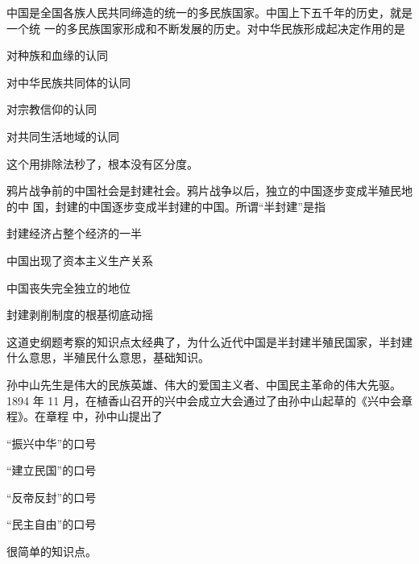 \documentclass[lang=cn,newtx,10pt,scheme=chinese,pad,twocol]{zznote}
\begin{document}
\begin{exercise}中国是全国各族人民共同缔造的统一的多民族国家。中国上下五千年的历史，就是一个统 一的多民族国家形成和不断发展的历史。对中华民族形成起决定作用的是
	\begin{choice}
		\item 对种族和血缘的认同
		\item 对中华民族共同体的认同
		\item 对宗教信仰的认同
		\item 对共同生活地域的认同
	\end{choice}
\end{exercise}
\begin{solution}
	这个用排除法秒了，根本没有区分度。
\end{solution}


\begin{exercise}鸦片战争前的中国社会是封建社会。鸦片战争以后，独立的中国逐步变成半殖民地的中 国，封建的中国逐步变成半封建的中国。所谓“半封建”是指
	\begin{choice}
		\item 封建经济占整个经济的一半
		\item 中国出现了资本主义生产关系
		\item 中国丧失完全独立的地位
		\item 封建剥削制度的根基彻底动摇
	\end{choice}
\end{exercise}
\begin{solution}
	这道史纲题考察的知识点太经典了，为什么近代中国是半封建半殖民国家，半封建什么意思，半殖民什么意思，基础知识。
\end{solution}


\begin{exercise}孙中山先生是伟大的民族英雄、伟大的爱国主义者、中国民主革命的伟大先驱。1894 年 11 月，在植香山召开的兴中会成立大会通过了由孙中山起草的《兴中会章程》。在章程 中，孙中山提出了
	\begin{choice}
		\item “振兴中华”的口号
		\item “建立民国”的口号
		\item “反帝反封”的口号
		\item “民主自由”的口号
	\end{choice}
\end{exercise}
\begin{solution}
	很简单的知识点。
\end{solution}
\end{document}

